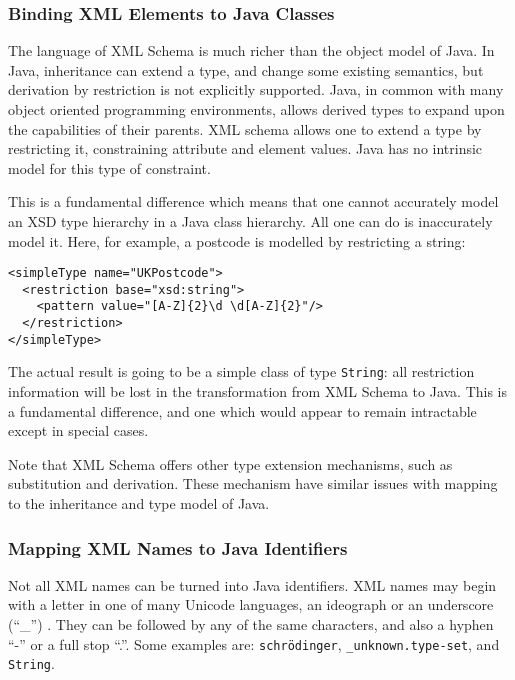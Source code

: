 \subsubsection{Binding XML Elements to Java Classes}
\label{objections:o-x:xml-classes}

The language of XML Schema is much richer than the object model of
Java. In Java, inheritance can extend a type, and change some existing
semantics, but derivation by restriction is not explicitly
supported. Java, in common with many object oriented programming
environments, allows derived types to expand upon the capabilities of
their parents. XML schema allows one to extend a type by restricting
it, constraining attribute and element values. Java has no intrinsic
model for this type of constraint.

This is a fundamental difference which means that one cannot
accurately model an XSD type hierarchy in a Java class hierarchy. All
one can do is inaccurately model it. Here, for example, a postcode is
modelled by restricting a string:


\begin{verbatim}
<simpleType name="UKPostcode">
  <restriction base="xsd:string">
    <pattern value="[A-Z]{2}\d \d[A-Z]{2}"/>
  </restriction>
</simpleType>
\end{verbatim}

The actual result is going to be a simple class of type {\tt String}:
all restriction information will be lost in the transformation from
XML Schema to Java. This is a fundamental difference, and one which
would appear to remain intractable except in special cases.

Note that XML Schema offers other type extension mechanisms, such as
substitution and derivation. These mechanism have similar issues with mapping
to the inheritance and type model of Java. 

\subsubsection{Mapping XML Names to Java Identifiers}
\label{objections:o-x:names}

Not all XML names can be turned into Java identifiers.  XML names may
begin with a letter in one of many Unicode languages, an ideograph or
an underscore (``\_'') . They can be followed by any of the same
characters, and also a hyphen ``-'' or a full stop ``.''. Some
examples are: {\tt schr\"odinger}, {\tt \_unknown.type-set}, and {\tt
String}.


